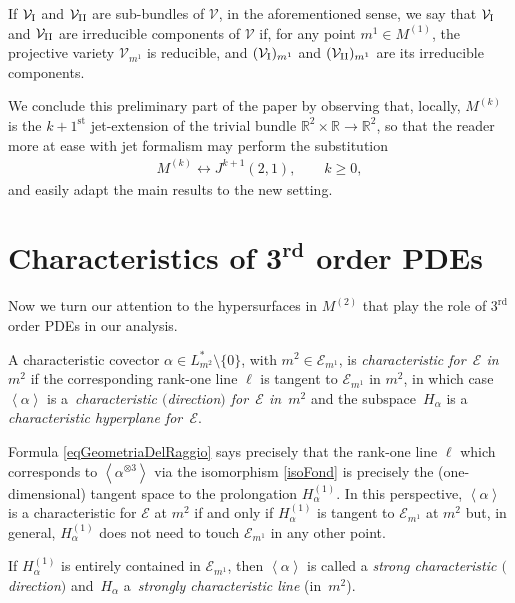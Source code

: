 \documentclass[pdftex]{sigma}
\newcommand{\M}{\mathcal{V}}
\newcommand{\MM}{\mathcal{V}_{\textrm{\normalfont I}}}
\newcommand{\MMM}{\mathcal{V}_{\textrm{\normalfont II}}}
\newcommand{\E}{\mathcal{E}}
\newcommand{\Span}[1]{\left\langle #1 \right\rangle}
\newcommand{\St}{^\textrm{st}}
\newcommand{\Rd}{^\textrm{rd}}
\numberwithin{equation}{section}
\begin{document}
If $\MM$ and $\MMM$ are sub-bundles of $\M$, in the aforementioned sense, we say that $\MM$ and $\MMM$ are irreducible components of $\M$ if, for any point $m^1\in M^{(1)}$, the projective variety $\M_{m^1}$ is reducible, and $(\MM)_{m^1}$ and $(\MMM)_{m^1}$ are its irreducible components.

We conclude this preliminary part of the paper by observing that, locally, $M^{(k)}$ is the $k+1\St$ jet-extension of the trivial bundle $\mathbb{R}^2\times\mathbb{R}\to\mathbb{R}^2$, so that the reader more at ease with jet formalism may perform the substitution
 \begin{gather}\label{sostituzionePerIGettofili}
 M^{(k)}\longleftrightarrow J^{k+1}(2,1) ,\qquad k\geq 0 ,
\end{gather}
and easily adapt the main results to the new setting.

\section[Characteristics of $3\Rd$ order PDEs]{Characteristics of $\boldsymbol{3\Rd}$ order PDEs}\label{SecChar3ordPDEs}

Now we turn our attention to the hypersurfaces in $M^{(2)}$ that play the role of $3\Rd$ order PDEs in our analysis.

\begin{Definition} A characteristic covector $\alpha\in L_{m^2}^\ast{\setminus}\{0\}$, with $m^2\in\E_{m^1}$, is \emph{characteristic for~$\E$ in~$m^2$} if the corresponding rank-one line $\ell$ is tangent to $\E_{m^1}$ in $m^2$, in which case $\Span{\alpha}$ is a~\emph{characteristic $($direction$)$ for~$\E$ in~$m^2$} and the subspace~$H_\alpha$ is a \emph{characteristic hyperplane for~$\E$}.
\end{Definition}

Formula
 \eqref{eqGeometriaDelRaggio} says precisely that the rank-one line $\ell$ which corresponds to $\Span{\alpha^{\otimes 3}}$ via the isomorphism \eqref{isoFond} is precisely the (one-dimensional) tangent space to the prolongation $H_\alpha^{(1)}$. In this perspective, $\Span{\alpha}$ is a characteristic for $\E$ at $m^2$ if and only if $ H_\alpha^{(1)}$ is tangent to $\E_{m^1}$ at $m^2$ but, in general, $ H_\alpha^{(1)}$ does not need to touch $\E_{m^1}$ in any other point.
\begin{Definition}\label{defStrongChar}
 If $ H_\alpha^{(1)}$ is {entirely contained} in $\E_{m^1}$, then $\Span{\alpha}$ is called a \emph{strong characteristic $($direction$)$} and~$H_\alpha$ a~\emph{strongly characteristic line} (in~$m^2$).
\end{Definition}
\end{document}
